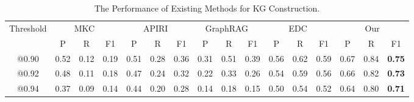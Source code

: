 

\begin{table*}[t]
\centering
\caption{The Performance of Existing Methods for KG Construction.}
\label{tab: rq22res}
\begin{tabular}{c|ccc|lll|ccc|ccc|ccc}
\hline
\multirow{2}{*}{Threshold} & \multicolumn{3}{c|}{MKC~\cite{Manual}}  & \multicolumn{3}{c|}{APIRI~\cite{yanbang2}} & \multicolumn{3}{c|}{GraphRAG~\cite{GraphRAG}} & \multicolumn{3}{c|}{EDC~\cite{EDC}} & \multicolumn{3}{c}{Our} \\ \cline{2-16} 
& \multicolumn{1}{c|}{P}    & \multicolumn{1}{c|}{R}    & F1   & \multicolumn{1}{c|}{P}    & \multicolumn{1}{c|}{R}    & \multicolumn{1}{c|}{F1} & \multicolumn{1}{c|}{P}    & \multicolumn{1}{c|}{R}    & F1   & \multicolumn{1}{c|}{P}    & \multicolumn{1}{c|}{R}    & F1   & \multicolumn{1}{c|}{P}    & \multicolumn{1}{c|}{R}    & F1   \\ \hline
@0.90                      & \multicolumn{1}{c|}{0.52} & \multicolumn{1}{c|}{0.12} & 0.19 & \multicolumn{1}{l|}{0.51} & \multicolumn{1}{l|}{0.28} & 0.36                    & \multicolumn{1}{c|}{0.31} & \multicolumn{1}{c|}{0.51} & 0.39 & \multicolumn{1}{c|}{0.56} & \multicolumn{1}{c|}{0.62} & 0.59 & \multicolumn{1}{c|}{0.67} & \multicolumn{1}{c|}{0.84} & \textbf{0.75} \\ \hline
@0.92                      & \multicolumn{1}{c|}{0.48} & \multicolumn{1}{c|}{0.11} & 0.18 & \multicolumn{1}{l|}{0.47} & \multicolumn{1}{l|}{0.24} & 0.32                    & \multicolumn{1}{c|}{0.22} & \multicolumn{1}{c|}{0.33} & 0.26 & \multicolumn{1}{c|}{0.54} & \multicolumn{1}{c|}{0.59} & 0.56 & \multicolumn{1}{c|}{0.66} & \multicolumn{1}{c|}{0.82} & \textbf{0.73} \\ \hline
@0.94                      & \multicolumn{1}{c|}{0.37} & \multicolumn{1}{c|}{0.09} & 0.14 & \multicolumn{1}{l|}{0.44} & \multicolumn{1}{l|}{0.20} & 0.28                    & \multicolumn{1}{c|}{0.14} & \multicolumn{1}{c|}{0.18} & 0.15 & \multicolumn{1}{c|}{0.50} & \multicolumn{1}{c|}{0.54} & 0.52 & \multicolumn{1}{c|}{0.64} & \multicolumn{1}{c|}{0.80} & \textbf{0.71} \\ \hline
\end{tabular}
\end{table*}

